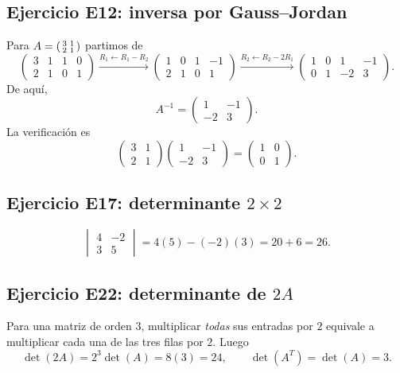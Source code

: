 \documentclass[12pt]{article}
\theoremstyle{remark}
\begin{document}
\subsection*{Ejercicio E12: inversa por Gauss--Jordan}
Para $A=\begin{psmallmatrix}3&1\\2&1\end{psmallmatrix}$ partimos de
\[
\left(\begin{array}{cc|cc}3&1&1&0\\2&1&0&1\end{array}\right)
\xrightarrow{R_1\leftarrow R_1-R_2}
\left(\begin{array}{cc|cc}1&0&1&-1\\2&1&0&1\end{array}\right)
\xrightarrow{R_2\leftarrow R_2-2R_1}
\left(\begin{array}{cc|cc}1&0&1&-1\\0&1&-2&3\end{array}\right).
\]
De aquí,
\[
\boxed{A^{-1}=\begin{pmatrix}1&-1\\-2&3\end{pmatrix}}.
\]
La verificación es
\[
\begin{pmatrix}3&1\\2&1\end{pmatrix}
\begin{pmatrix}1&-1\\-2&3\end{pmatrix}
=\begin{pmatrix}1&0\\0&1\end{pmatrix}.
\]

\subsection*{Ejercicio E17: determinante $2\times2$}
\[
\begin{vmatrix}4&-2\\3&5\end{vmatrix}=4(5)-(-2)(3)=20+6=\boxed{26}.
\]

\subsection*{Ejercicio E22: determinante de $2A$}
Para una matriz de orden $3$, multiplicar \emph{todas} sus entradas por $2$ equivale a multiplicar cada una de las tres filas por $2$. Luego
\[
\det(2A)=2^3\det(A)=8(3)=\boxed{24},\qquad
\det(A^T)=\det(A)=\boxed{3}.
\]
\end{document}
